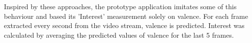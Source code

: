 

\noindent Inspired by these approaches, the prototype application imitates some of this behaviour and based its 'Interest' measurement solely on valence. For each frame extracted every second from the video stream, valence is predicted. Interest was calculated by averaging the predicted values of valence for the last 5 frames.

